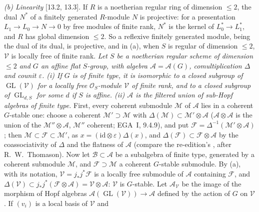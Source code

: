 \par\smallskip\noindent\textit{(b) Linearity} [13.2, 13.3]. If \(R\) is a noetherian regular
ring of dimension \(\leq2\), the dual \(N^*\) of a finitely generated \(R\)-module \(N\) is
projective: for a presentation \(L_1\to L_0\to N\to0\) by free modules of finite rank, \(N^*\)
is the kernel of \(L_0^*\to L_1^*\), and \(R\) has global dimension \(\leq2\). So a reflexive
finitely generated module, being the dual of its dual, is projective, and in (a), when \(S\)
is regular of dimension \(\leq2\), \(\mathcal V\) is locally free of finite rank. \emph{Let
\(S\) be a noetherian regular scheme of dimension \(\leq2\) and \(G\) an affine flat
\(S\)-group, with algebra \(\mathcal A=\mathcal A(G)\), comultiplication \(\Delta\) and counit
\(\varepsilon\). \textup{(i)} If \(G\) is of finite type, it is isomorphic to a closed subgroup
of \(\operatorname{GL}(\mathcal V)\) for a locally free \(\mathcal O_S\)-module \(\mathcal V\)
of finite rank, and to a closed subgroup of \(\operatorname{GL}_{d,S}\) for some \(d\) if \(S\)
is affine. \textup{(ii)} \(\mathcal A\) is the filtered union of sub-Hopf algebras of finite
type.} First, every coherent submodule \(\mathcal M\) of \(\mathcal A\) lies in a coherent
\(G\)-stable one: choose a coherent \(\mathcal M'\supset\mathcal M\) with
\(\Delta(\mathcal M)\subset\mathcal M'\otimes\mathcal A\) (\(\mathcal A\otimes\mathcal A\) is the
union of the \(\mathcal M''\otimes\mathcal A\), \(\mathcal M''\) coherent; EGA~I, 9.4.9), and
put \(\mathcal F=\Delta^{-1}(\mathcal M'\otimes\mathcal A)\); then
\(\mathcal M\subset\mathcal F\subset\mathcal M'\), as \(x=(\mathrm{id}\otimes\varepsilon)\Delta(x)\),
and \(\Delta(\mathcal F)\subset\mathcal F\otimes\mathcal A\) by the coassociativity of \(\Delta\)
and the flatness of \(\mathcal A\) (compare the re-edition's
, after R.~W.~Thomason). Now let
\(\mathcal B\subset\mathcal A\) be a subalgebra of finite type, generated by a coherent
submodule \(\mathcal M\), and \(\mathcal F\supset\mathcal M\) a coherent \(G\)-stable
submodule. By (a), with its notation, \(\mathcal V=j_*j^*\mathcal F\) is a locally free
submodule of \(\mathcal A\) containing \(\mathcal F\), and
\(\Delta(\mathcal V)\subset j_*j^*(\mathcal F\otimes\mathcal A)=\mathcal V\otimes\mathcal A\):
\(\mathcal V\) is \(G\)-stable. Let \(\mathcal A_{\mathcal V}\) be the image of the morphism of
Hopf algebras \(\mathcal A(\operatorname{GL}(\mathcal V))\to\mathcal A\) defined by the action of
\(G\) on \(\mathcal V\). If \((v_i)\) is a local basis of \(\mathcal V\) and
